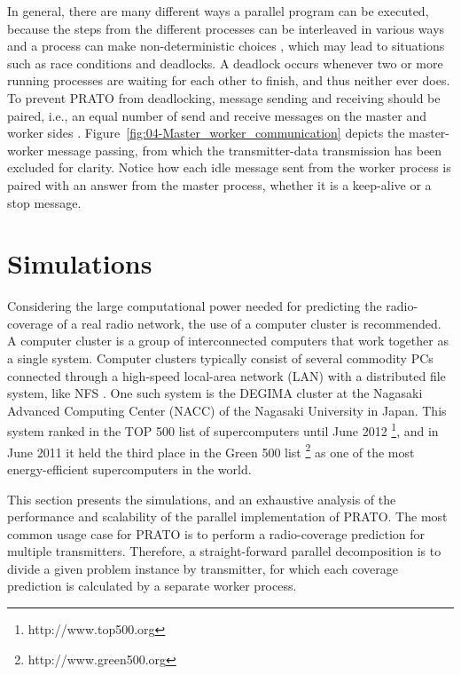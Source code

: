 In general, there are many different ways a parallel program can be
executed, because the steps from the different processes can be interleaved
in various ways and a process can make non-deterministic choices \cite{Siegel_Verification_of_halting_properties_for_MPI_programs:2007},
which may lead to situations such as race conditions \cite{Clemencon_MPI_Race_detection:1995}
and deadlocks. A deadlock occurs whenever two or more running processes
are waiting for each other to finish, and thus neither ever does.
To prevent PRATO from deadlocking, message sending and receiving should
be paired, i.e., an equal number of send and receive messages on the
master and worker sides \cite{Siegel_Verification_of_halting_properties_for_MPI_programs:2007}.
Figure~\ref{fig:04-Master_worker_communication} depicts the master-worker
message passing, from which the transmitter-data transmission has
been excluded for clarity. Notice how each idle message sent from
the worker process is paired with an answer from the master process,
whether it is a keep-alive or a stop message.


\section{Simulations \label{sec:04-Simulations}}

Considering the large computational power needed for predicting the
radio-coverage of a real radio network, the use of a computer cluster
is recommended. A computer cluster is a group of interconnected computers
that work together as a single system. Computer clusters typically
consist of several commodity PCs connected through a high-speed local-area
network (LAN) with a distributed file system, like NFS \cite{Shepler_Network_file_system:2003}.
One such system is the DEGIMA cluster \cite{Hamada_Cluster_of_GPUs:2010}
at the Nagasaki Advanced Computing Center (NACC)
of the Nagasaki University in Japan. This system ranked in the TOP
500 list of supercomputers until June 2012%
\footnote{http://www.top500.org%
}, and in June 2011 it held the third place in the Green 500 list%
\footnote{http://www.green500.org%
} as one of the most energy-efficient supercomputers in the world.

This section presents the simulations, and an exhaustive analysis
of the performance and scalability of the parallel implementation
of PRATO. The most common usage case for PRATO is to perform a radio-coverage
prediction for multiple transmitters. Therefore, a straight-forward
parallel decomposition is to divide a given problem instance by transmitter,
for which each coverage prediction is calculated by a separate worker
process.

